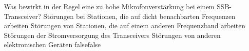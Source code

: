     {Was bewirkt in der Regel eine zu hohe Mikrofonverstärkung bei einem SSB-Transceiver?}
    {Störungen bei Stationen, die auf dicht benachbarten Frequenzen arbeiten}
    {Störungen von Stationen, die auf einem anderen Frequenzband arbeiten}
    {Störungen der Stromversorgung des Transceivers}
    {Störungen von anderen elektronischen Geräten}
    {false}{false}